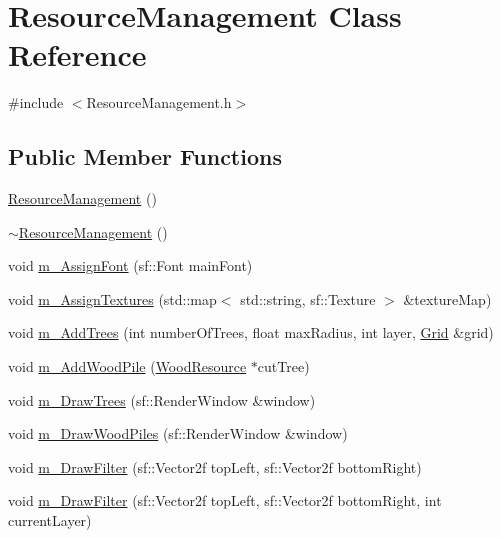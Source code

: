 \hypertarget{class_resource_management}{}\section{Resource\+Management Class Reference}
\label{class_resource_management}


{\ttfamily \#include $<$Resource\+Management.\+h$>$}

\subsection*{Public Member Functions}
\begin{DoxyCompactItemize}
\item 
\mbox{\hyperlink{class_resource_management_a02281ce42dd7ad245f1bc2e15a0e3b55}{Resource\+Management}} ()
\item 
\mbox{\hyperlink{class_resource_management_ad448fc4b19d44fa4cad1bb7a4b9ecd29}{$\sim$\+Resource\+Management}} ()
\item 
void \mbox{\hyperlink{class_resource_management_af7b5fdb2f6e706f99558ff8a90150f41}{m\+\_\+\+Assign\+Font}} (sf\+::\+Font main\+Font)
\item 
void \mbox{\hyperlink{class_resource_management_a5fcb80797408756492abe32cf40ae85f}{m\+\_\+\+Assign\+Textures}} (std\+::map$<$ std\+::string, sf\+::\+Texture $>$ \&texture\+Map)
\item 
void \mbox{\hyperlink{class_resource_management_a2439d8ace4e693d37c5a422eaf422e38}{m\+\_\+\+Add\+Trees}} (int number\+Of\+Trees, float max\+Radius, int layer, \mbox{\hyperlink{class_grid}{Grid}} \&grid)
\item 
void \mbox{\hyperlink{class_resource_management_a97cf5550612a2e1cd82d44ae9e57f666}{m\+\_\+\+Add\+Wood\+Pile}} (\mbox{\hyperlink{class_wood_resource}{Wood\+Resource}} $\ast$cut\+Tree)
\item 
void \mbox{\hyperlink{class_resource_management_ac02284dd76b1cc071e1a16432a858aae}{m\+\_\+\+Draw\+Trees}} (sf\+::\+Render\+Window \&window)
\item 
void \mbox{\hyperlink{class_resource_management_a9e52ae158b5ea38f2d935d25a3536e34}{m\+\_\+\+Draw\+Wood\+Piles}} (sf\+::\+Render\+Window \&window)
\item 
void \mbox{\hyperlink{class_resource_management_adeebfc769325c37dadf5a25181786496}{m\+\_\+\+Draw\+Filter}} (sf\+::\+Vector2f top\+Left, sf\+::\+Vector2f bottom\+Right)
\item 
void \mbox{\hyperlink{class_resource_management_aeb7c4ef68841e3eeb7aa7569943af652}{m\+\_\+\+Draw\+Filter}} (sf\+::\+Vector2f top\+Left, sf\+::\+Vector2f bottom\+Right, int current\+Layer)

\end{DoxyCompactItemize}
